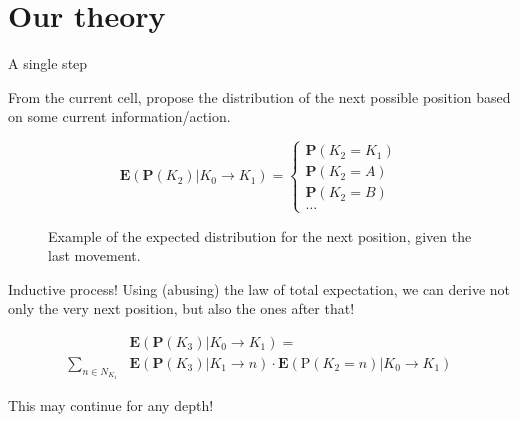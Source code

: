 \documentclass[english]{beamer}
\begin{document}
\section{Our theory}
\begin{frame}{A single step}

  From the current cell, propose the distribution of the next possible position based on some current information/action.

  \begin{figure}
    \centering
    \begin{equation*}
      \mathbf{E}\left( \mathbf{P}\left(K_2\right) | K_0 \to K_1\right) =
      \begin{cases}
          \mathbf{P}\left(K_2 = K_1\right)\\
          \mathbf{P}\left(K_2 = A\right)\\
          \mathbf{P}\left(K_2 = B\right)\\
          \dots
      \end{cases}
    \end{equation*}
    \caption{Example of the expected distribution for the next position, given the last movement.}
  \end{figure}
\end{frame}

\begin{frame}{Inductive process!}
  Using (abusing) the law of total expectation, we can derive not only the very next position, but also the ones after that!

  \begin{align*}
  &\mathbf{E}\left( \mathbf{P}\left(K_3\right) | K_0 \to K_1\right) =\\
  \sum_{n \in N_{K_1}} &\mathbf{E}\left( \mathbf{P}\left(K_3\right)  | K_1 \to n\right)\cdot\mathbf{E}\left(\mathrm{P}(K_2 = n) | K_0 \to K_1\right)
  \end{align*}

  This may continue for any depth!
\end{frame}
\end{document}
